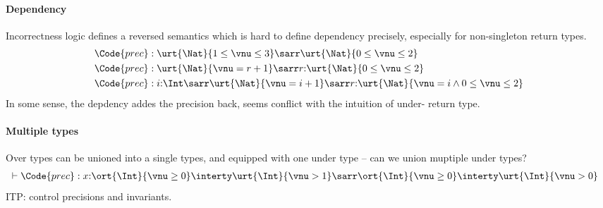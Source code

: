 \paragraph{Dependency} Incorrectness logic defines a reversed semantics which is hard to define dependency precisely, especially for non-singleton return types.
\begin{align*}
    \Code{prec} :\;& \urt{\Nat}{1 \leq \vnu \leq 3} \sarr \urt{\Nat}{0 \leq \vnu \leq 2} \\
    \Code{prec} :\;& \urt{\Nat}{\vnu = r + 1} \sarr r{:}\urt{\Nat}{0 \leq \vnu \leq 2} \\
    \Code{prec} :\;& i{:}\Int \sarr \urt{\Nat}{\vnu = i + 1} \sarr r{:}\urt{\Nat}{\vnu = i \land 0 \leq \vnu \leq 2} \\
\end{align*}\noindent
In some sense, the depdency addes the precision back, seems conflict with the intuition of under- return type.

\paragraph{Multiple types} Over types can be unioned into a single types, and equipped with one under type -- can we union muptiple under types?
\begin{align*}
    &\vdash \Code{prec} : x{:}\ort{\Int}{\vnu \geq 0} \interty \urt{\Int}{\vnu > 1} \sarr \ort{\Int}{\vnu \geq 0} \interty \urt{\Int}{\vnu > 0}
\end{align*}\noindent
ITP: control precisions and invariants.


